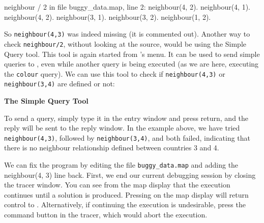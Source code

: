 \begin{code}
neighbour / 2 in file buggy_data.map, line 2:
neighbour(4, 2).
neighbour(4, 1).
neighbour(4, 2).
neighbour(3, 1).
neighbour(3, 2).
neighbour(1, 2).
\end{code}


So \verb'neighbour(4,3)' was indeed missing (it is commented out).
Another way to check \verb'neighbour/2', without looking at the source,
would be using the
Simple Query tool. This tool is again started from {\tkeclipse}'s
 menu. It can be used to send simple queries to {\eclipse},
even while another query is being executed (as we are here, executing the
\verb'colour' query). We can use this tool to check if \verb'neighbour(4,3)'
or \verb'neighbour(3,4)' are defined or not:

\begin{center}

\vspace{3mm}
{\bf The Simple Query Tool}
\end{center}

To send a query, simply type it in the entry window and press return, and
the reply will be sent to the reply window. In the example above, we have
tried \verb'neighbour(4,3)', followed by \verb'neighbour(3,4)', and
both failed, indicating that there is no neighbour relationship defined
between countries 3 and 4.

\begin{sloppypar}
 We can fix the program by editing
the file \verb'buggy_data.map' and adding the neighbour(4, 3) line back.
First, we end our current debugging session by
closing the tracer window. You can see from the map display that the
execution continues until a solution is produced. 
Pressing  on the map display will return control to
{\eclipse}. Alternatively, if continuing the execution is undesirable,  press the  command button in
the tracer, which would abort the execution.
\end{sloppypar}


